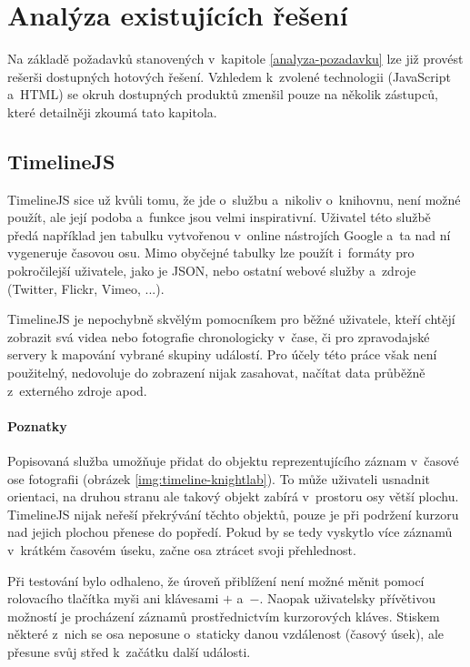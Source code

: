 \graphicspath{{text/analyza-existujicich-reseni/img/}}

\chapter{Analýza existujících řešení}
\label{analyza-existujicich-reseni}
	
	Na základě požadavků stanovených v~kapitole \ref{analyza-pozadavku} lze již provést rešerši dostupných hotových řešení. Vzhledem k~zvolené technologii (JavaScript a~HTML) se okruh dostupných produktů zmenšil pouze na několik zástupců, které detailněji zkoumá tato kapitola.
	
	\section{\sf TimelineJS}
	\label{analyza-timelinejs}
		{\sf TimelineJS} sice už kvůli tomu, že jde o~službu a~nikoliv o~knihovnu, není možné použít, ale její podoba a~funkce jsou velmi inspirativní. Uživatel této službě předá například jen tabulku vytvořenou v~online nástrojích Google a~ta nad ní vygeneruje časovou osu. Mimo obyčejné tabulky lze použít i~formáty pro pokročilejší uživatele, jako je JSON, nebo ostatní webové služby a~zdroje (Twitter, Flickr, Vimeo, ...).
		
		{\sf TimelineJS} je nepochybně skvělým pomocníkem pro běžné uživatele, kteří chtějí zobrazit svá videa nebo fotografie chronologicky v~čase, či pro zpravodajské servery k mapování vybrané skupiny událostí. Pro účely této práce však není použitelný, nedovoluje do zobrazení nijak zasahovat, načítat data průběžně z~externého zdroje apod.
		
		\subsubsection*{Poznatky} 
		Popisovaná služba umožňuje přidat do objektu reprezentujícího záznam v~časové ose fotografii (obrázek \ref{img:timeline-knightlab}). To může uživateli usnadnit orientaci, na druhou stranu ale takový objekt zabírá v~prostoru osy větší plochu. {\sf TimelineJS} nijak neřeší překrývání těchto objektů, pouze je při podržení kurzoru nad jejich plochou přenese do popředí. Pokud by se tedy vyskytlo více záznamů v~krátkém časovém úseku, začne osa ztrácet svoji přehlednost.
		
		Při testování bylo odhaleno, že úroveň přiblížení není možné měnit pomocí rolovacího tlačítka myši ani klávesami $+$ a~$-$. Naopak uživatelsky přívětivou možností je procházení záznamů prostřednictvím kurzorových kláves. Stiskem některé z~nich se osa neposune o~staticky danou vzdálenost (časový úsek), ale přesune svůj střed k~začátku další události.
		
